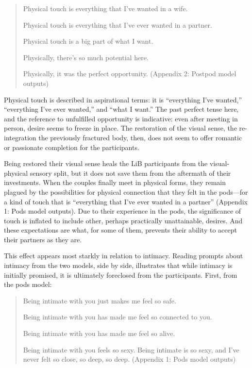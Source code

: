 \documentclass[11pt]{article}
\begin{document}
\begin{quote}
Physical touch is everything that I’ve wanted in a wife.

Physical touch is everything that I’ve ever wanted in a partner.

Physical touch is a big part of what I want.

Physically, there’s so much potential here.

Physically, it was the perfect opportunity. (Appendix 2: Postpod model
outputs)
\end{quote}
Physical touch is described in aspirational terms: it is “everything
I’ve wanted,” “everything I’ve ever wanted,” and “what I want.” The
past perfect tense here, and the reference to unfulfilled opportunity
is indicative: even after meeting in person, desire seems to freeze in
place. The restoration of the visual sense, the re-integration the
previously fractured body, then, does not seem to offer romantic or
passionate completion for the participants.

Being restored their visual sense heals the LiB participants from the
visual-physical sensory split, but it does not save them from the
aftermath of their investments. When the couples finally meet in
physical forms, they remain plagued by the possibilities for physical
connection that they felt in the pods—for a kind of touch that is
“everything that I’ve ever wanted in a partner” (Appendix 1: Pods
model outputs). Due to their experience in the pods, the significance
of touch is inflated to include other, perhaps practically
unattainable, desires. And these expectations are what, for some of
them, prevents their ability to accept their partners as they are.

This effect appears most starkly in relation to intimacy. Reading
prompts about intimacy from the two models, side by side, illustrates
that while intimacy is initially promised, it is ultimately foreclosed
from the participants. First, from the pods model:

\begin{quote}
Being intimate with you just makes me feel so safe.

Being intimate with you has made me feel so connected to you.

Being intimate with you has made me feel so alive.

Being intimate with you feels so sexy. Being intimate is so sexy, and
I’ve never felt so close, so deep, so deep. (Appendix 1: Pods model
outputs)
\end{quote}
\end{document}
